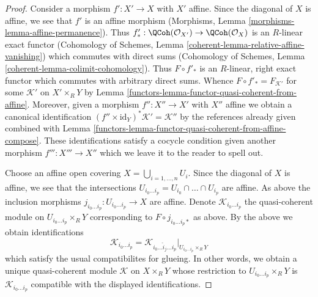 \begin{proof}

Consider a morphism $f' : X' \to X$ with $X'$ affine. Since the
diagonal of $X$ is affine, we see that $f'$ is an affine morphism
(Morphisms, Lemma \ref{morphisms-lemma-affine-permanence}).
Thus $f'_* : \QCoh(\mathcal{O}_{X'}) \to \QCoh(\mathcal{O}_X)$
is an $R$-linear exact functor
(Cohomology of Schemes, Lemma \ref{coherent-lemma-relative-affine-vanishing})
which commutes with direct sums
(Cohomology of Schemes, Lemma \ref{coherent-lemma-colimit-cohomology}).
Thus $F \circ f'_*$ is an $R$-linear, right exact functor which commutes
with arbitrary direct sums. Whence
$F \circ f'_* = F_{\mathcal{K}'}$ for some $\mathcal{K}'$
on $X' \times_R Y$ by Lemma \ref{functors-lemma-functor-quasi-coherent-from-affine}.
Moreover, given a morphism $f'' : X'' \to X'$ with $X''$ affine
we obtain a canonical identification
$(f'' \times \text{id}_Y)^*\mathcal{K}' = \mathcal{K}''$
by the references already given combined with
Lemma \ref{functors-lemma-functor-quasi-coherent-from-affine-compose}.
These identifications satisfy a cocycle condition given
another morphism $f''' : X''' \to X''$ which we leave it to
the reader to spell out.

\medskip\noindent
Choose an affine open covering $X = \bigcup_{i = 1, \ldots, n} U_i$.
Since the diagonal of $X$ is affine, we see that the intersections
$U_{i_0 \ldots i_p} = U_{i_0} \cap \ldots \cap U_{i_p}$ are affine.
As above the inclusion morphisms
$j_{i_0 \ldots i_p} : U_{i_0 \ldots i_p} \to X$ are affine.
Denote $\mathcal{K}_{i_0 \ldots i_p}$ the quasi-coherent module
on $U_{i_0 \ldots i_p} \times_R Y$ corresponding to
$F \circ j_{i_0 \ldots i_p *}$ as above.
By the above we obtain identifications
$$
\mathcal{K}_{i_0 \ldots i_p} =
\mathcal{K}_{i_0 \ldots \hat i_j \ldots i_p}|_{U_{i_0 \ldots i_p} \times_R Y}
$$
which satisfy the usual compatibilites for glueing. In other words, we obtain
a unique quasi-coherent module $\mathcal{K}$ on $X \times_R Y$
whose restriction to $U_{i_0 \ldots i_p} \times_R Y$ is
$\mathcal{K}_{i_0 \ldots i_p}$ compatible with the displayed identifications.


\end{proof}
